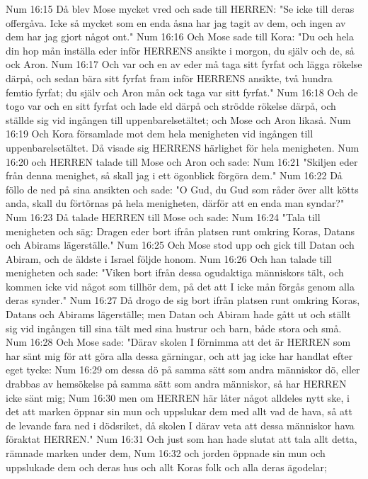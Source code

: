Num 16:15  Då blev Mose mycket vred och sade till HERREN: "Se icke till deras offergåva. Icke så mycket som en enda åsna har jag tagit av dem, och ingen av dem har jag gjort något ont."
Num 16:16  Och Mose sade till Kora: "Du och hela din hop mån inställa eder inför HERRENS ansikte i morgon, du själv och de, så ock Aron.
Num 16:17  Och var och en av eder må taga sitt fyrfat och lägga rökelse därpå, och sedan bära sitt fyrfat fram inför HERRENS ansikte, två hundra femtio fyrfat; du själv och Aron mån ock taga var sitt fyrfat."
Num 16:18  Och de togo var och en sitt fyrfat och lade eld därpå och strödde rökelse därpå, och ställde sig vid ingången till uppenbarelsetältet; och Mose och Aron likaså.
Num 16:19  Och Kora församlade mot dem hela menigheten vid ingången till uppenbarelsetältet. Då visade sig HERRENS härlighet för hela menigheten.
Num 16:20  och HERREN talade till Mose och Aron och sade:
Num 16:21  "Skiljen eder från denna menighet, så skall jag i ett ögonblick förgöra dem."
Num 16:22  Då föllo de ned på sina ansikten och sade: "O Gud, du Gud som råder över allt kötts anda, skall du förtörnas på hela menigheten, därför att en enda man syndar?"
Num 16:23  Då talade HERREN till Mose och sade:
Num 16:24  "Tala till menigheten och säg: Dragen eder bort ifrån platsen runt omkring Koras, Datans och Abirams lägerställe."
Num 16:25  Och Mose stod upp och gick till Datan och Abiram, och de äldste i Israel följde honom.
Num 16:26  Och han talade till menigheten och sade: "Viken bort ifrån dessa ogudaktiga människors tält, och kommen icke vid något som tillhör dem, på det att I icke mån förgås genom alla deras synder."
Num 16:27  Då drogo de sig bort ifrån platsen runt omkring Koras, Datans och Abirams lägerställe; men Datan och Abiram hade gått ut och ställt sig vid ingången till sina tält med sina hustrur och barn, både stora och små.
Num 16:28  Och Mose sade: "Därav skolen I förnimma att det är HERREN som har sänt mig för att göra alla dessa gärningar, och att jag icke har handlat efter eget tycke:
Num 16:29  om dessa dö på samma sätt som andra människor dö, eller drabbas av hemsökelse på samma sätt som andra människor, så har HERREN icke sänt mig;
Num 16:30  men om HERREN här låter något alldeles nytt ske, i det att marken öppnar sin mun och uppslukar dem med allt vad de hava, så att de levande fara ned i dödsriket, då skolen I därav veta att dessa människor hava föraktat HERREN."
Num 16:31  Och just som han hade slutat att tala allt detta, rämnade marken under dem,
Num 16:32  och jorden öppnade sin mun och uppslukade dem och deras hus och allt Koras folk och alla deras ägodelar;
